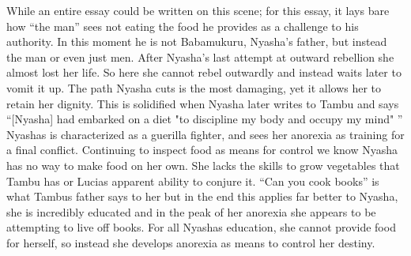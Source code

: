 \documentclass{article}
\begin{document}
While an entire essay could be written on this scene; for this essay, it lays bare how ``the man'' sees not eating the food he provides as a challenge to his authority. In this moment he is not Babamukuru, Nyasha's father, but instead the man or even just men. After Nyasha's last attempt at outward rebellion she almost lost her life. So here she cannot rebel outwardly and instead waits later to vomit it up. The path Nyasha cuts is the most damaging, yet it allows her to retain her dignity. This is solidified when Nyasha later writes to Tambu and says ``[Nyasha] had embarked on a diet "to discipline my body and occupy my mind" '' Nyashas is characterized as a guerilla fighter, and sees her anorexia as training for a final conflict. Continuing to inspect food as means for control we know Nyasha has no way to make food on her own. She lacks the skills to grow vegetables that Tambu has or Lucias apparent ability to conjure it. ``Can you cook books'' is what Tambus father says to her but in the end this applies far better to Nyasha, she is incredibly educated and in the peak of her anorexia she appears to be attempting to live off books. For all Nyashas education, she cannot provide food for herself, so instead she develops anorexia as means to control her destiny.
\end{document}
